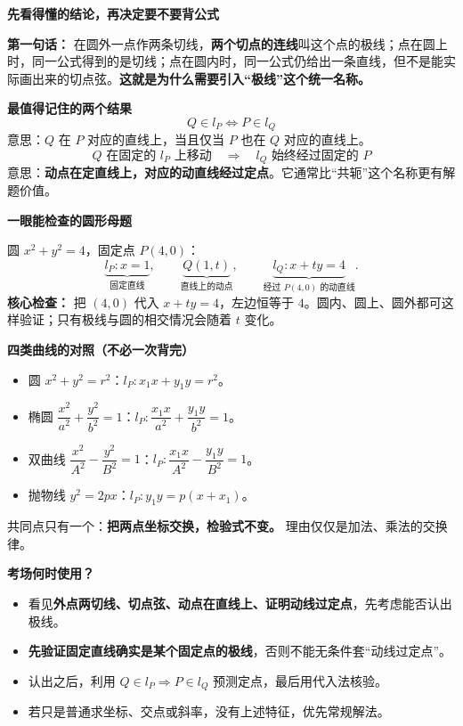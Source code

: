 \begin{summarybox}
\textbf{\textcolor{CSummary}{先看得懂的结论，再决定要不要背公式}}

\textbf{第一句话：} 在圆外一点作两条切线，\textbf{两个切点的连线}叫这个点的极线；点在圆上时，同一公式得到的是切线；点在圆内时，同一公式仍给出一条直线，但不是能实际画出来的切点弦。\textbf{这就是为什么需要引入“极线”这个统一名称。}

\medskip
\textbf{\textcolor{CSummary}{最值得记住的两个结果}}
\[
\boxed{Q\in l_P\iff P\in l_Q}
\]
意思：$Q$ 在 $P$ 对应的直线上，当且仅当 $P$ 也在 $Q$ 对应的直线上。
\[
\boxed{Q\text{ 在固定的 }l_P\text{ 上移动}\quad\Longrightarrow\quad l_Q\text{ 始终经过固定的 }P}
\]
意思：\textbf{动点在定直线上，对应的动直线经过定点}。它通常比“共轭”这个名称更有解题价值。

\medskip
\textbf{\textcolor{CSummary}{一眼能检查的圆形母题}}

圆 $x^2+y^2=4$，固定点 $P(4,0)$：
\[
\underbrace{l_P:x=1}_{\text{固定直线}},\qquad
\underbrace{Q(1,t)}_{\text{直线上的动点}},\qquad
\underbrace{l_Q:x+ty=4}_{\text{经过 }P(4,0)\text{ 的动直线}}.
\]
\textbf{核心检查：} 把 $(4,0)$ 代入 $x+ty=4$，左边恒等于 $4$。圆内、圆上、圆外都可这样验证；只有极线与圆的相交情况会随着 $t$ 变化。

\medskip
\textbf{\textcolor{CSummary}{四类曲线的对照（不必一次背完）}}
\begin{itemize}[leftmargin=*,itemsep=0.35em]
\item 圆 $x^2+y^2=r^2$：$l_P:x_1x+y_1y=r^2$。
\item 椭圆 $\dfrac{x^2}{a^2}+\dfrac{y^2}{b^2}=1$：$l_P:\dfrac{x_1x}{a^2}+\dfrac{y_1y}{b^2}=1$。
\item 双曲线 $\dfrac{x^2}{A^2}-\dfrac{y^2}{B^2}=1$：$l_P:\dfrac{x_1x}{A^2}-\dfrac{y_1y}{B^2}=1$。
\item 抛物线 $y^2=2px$：$l_P:y_1y=p(x+x_1)$。
\end{itemize}
共同点只有一个：\textbf{把两点坐标交换，检验式不变。} 理由仅仅是加法、乘法的交换律。

\medskip
\par\noindent\begin{minipage}{\linewidth}
\textbf{\textcolor{CSummary}{考场何时使用？}}
\begin{itemize}[leftmargin=*,itemsep=0.34em]
\item 看见\textbf{外点两切线、切点弦、动点在直线上、证明动线过定点}，先考虑能否认出极线。
\item \textbf{先验证固定直线确实是某个固定点的极线}，否则不能无条件套“动线过定点”。
\item 认出之后，利用 $Q\in l_P\Rightarrow P\in l_Q$ 预测定点，最后用代入法核验。
\item 若只是普通求坐标、交点或斜率，没有上述特征，优先常规解法。
\end{itemize}


\end{minipage}
\end{summarybox}
